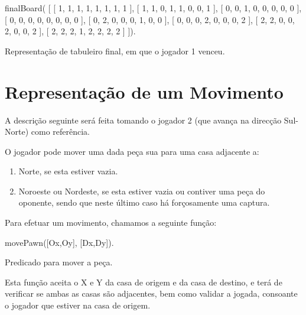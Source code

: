 \documentclass[15pt,a4paper]{article}
\begin{document}
\begin{code}[H]
	\begin{verbatimtab}

finalBoard(
	[
		[ 1, 1, 1, 1, 1, 1, 1, 1 ],
		[ 1, 1, 0, 1, 1, 0, 0, 1 ],
		[ 0, 0, 1, 0, 0, 0, 0, 0 ],
		[ 0, 0, 0, 0, 0, 0, 0, 0 ],
		[ 0, 2, 0, 0, 0, 1, 0, 0 ],
		[ 0, 0, 0, 2, 0, 0, 0, 2 ],
		[ 2, 2, 0, 0, 2, 0, 0, 2 ],
		[ 2, 2, 2, 1, 2, 2, 2, 2 ]
	]).
\end{verbatimtab}
\caption{Representação de tabuleiro final, em que o jogador 1 venceu.}
\end{code}


\newpage

\section{Representação de um Movimento}


A descrição seguinte será feita tomando o jogador 2 (que avança na direcção Sul-Norte) como referência.

O jogador pode mover uma dada peça sua para uma casa adjacente a:
\begin{enumerate}
\item Norte, se esta estiver vazia.
\item Noroeste ou Nordeste, se esta estiver vazia ou contiver uma peça do oponente, sendo que neste último caso há forçosamente uma captura.
\end{enumerate}
Para efetuar um movimento, chamamos a seguinte função:
\begin{code}[H]
	\begin{verbatimtab}

	movePawn([Ox,Oy], [Dx,Dy]).
\end{verbatimtab}
\caption{Predicado para mover a peça.}
\end{code}
Esta função aceita o X e Y da casa de origem e da casa de destino, e terá de verificar se ambas as casas são adjacentes, bem como validar a jogada, consoante o jogador que estiver na casa de origem.
\end{document}
